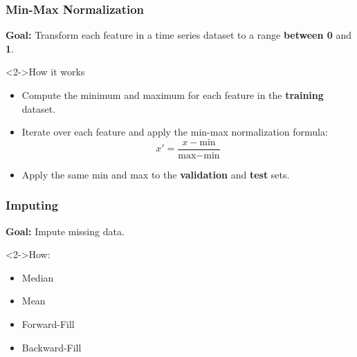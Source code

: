 \documentclass[t,english]{beamer}
\begin{document}
\begin{frame}
  \frametitle{Min-Max Normalization}
  \textbf{Goal:} Transform each feature in a time series dataset to a range \textbf{between 0} and \textbf{1}.

  \begin{block}<2->{How it works}
    \begin{itemize}
      \item<2-> Compute the minimum and maximum for each feature in the \textbf{training} dataset.
      \item<3-> Iterate over each feature and apply the min-max normalization formula:
            \begin{equation}
              x' = \frac{x - \text{min}}{\text{max} - \text{min}}
            \end{equation}
      \item<4-> Apply the same min and max to the \textbf{validation} and \textbf{test} sets.
    \end{itemize}
  \end{block}
\end{frame}

\begin{frame}
  \frametitle{Imputing}
  \textbf{Goal:} Impute missing data.

  \begin{block}<2->{How:}
    \begin{itemize}
      \item<2-> Median
      \item <3-> Mean
      \item <4-> Forward-Fill
      \item <5-> Backward-Fill
    \end{itemize}
  \end{block}
\end{frame}
\end{document}
